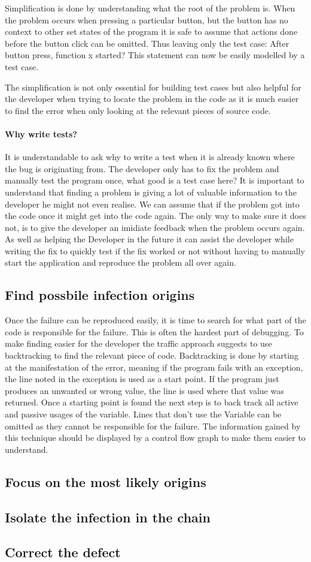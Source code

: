 Simplification is done by understanding what the root of the problem is. When the problem occurs when pressing a particular button, but the button has no context to other set states of the program it is safe to assume that actions done before the button click can be omitted. Thus leaving only the test case: After button press, function x started? This statement can now be easily modelled by a test case.

The simplification is not only essential for building test cases but also helpful for the developer when trying to locate the problem in the code as it is much easier to find the error when only looking at the relevant pieces of source code.

\paragraph{Why write tests?}
It is understandable to ask why to write a test when it is already known where the bug is originating from. The developer only has to fix the problem and manually test the program once, what good is a test case here?
It is important to understand that finding a problem is giving a lot of valuable information to the developer he might not even realise. We can assume that if the problem got into the code once it might get into the code again. The only way to make sure it does not, is to give the developer an imidiate feedback when the problem occurs again. As well as helping the Developer in the future it can assist the developer while writing the fix to quickly test if the fix worked or not without having to manually start the application and reproduce the problem all over again.



\subsection{Find possbile infection origins}
Once the failure can be reproduced easily, it is time to search for what part of the code is responsible for the failure. This is often the hardest part of debugging. To make finding easier for the developer the traffic approach suggests to use backtracking to find the relevant piece of code. Backtracking is done by starting at the manifestation of the error, meaning if the program fails with an exception, the line noted in the exception is used as a start point. If the program just produces an unwanted or wrong value, the line is used where that value was returned. Once a starting point is found the next step is to back track all active and passive usages of the variable. Lines that don't use the Variable can be omitted as they cannot be responsible for the failure. The information gained by this technique should be displayed by a control flow graph to make them easier to understand.


\subsection{Focus on the most likely origins}
\subsection{Isolate the infection in the chain}
\subsection{Correct the defect}
